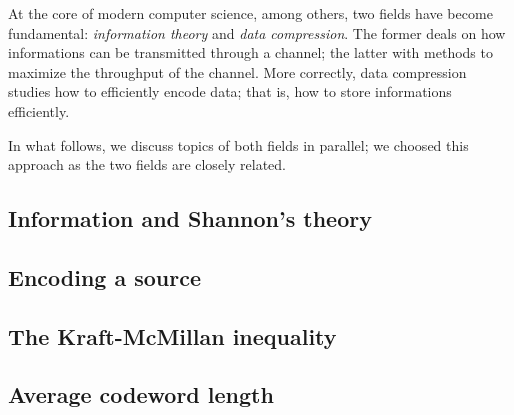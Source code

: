 \documentclass{subfiles}
\begin{document}
    At the core of modern computer science, among others, 
        two fields have become fundamental: \emph{information theory} 
        and \emph{data compression}. The former deals on how 
        informations can be transmitted through a channel; 
        the latter with methods to maximize the throughput of the channel.
        More correctly, data compression studies how to 
        efficiently encode data; that is, how to store informations efficiently.

    In what follows, we discuss topics of both fields in parallel; 
        we choosed this approach as the two fields are closely related.

    \subsection{Information and Shannon's theory}
    

    \subsection{Encoding a source}
    

    \subsection{The Kraft-McMillan inequality}
    

    \subsection{Average codeword length}
    
\end{document}
